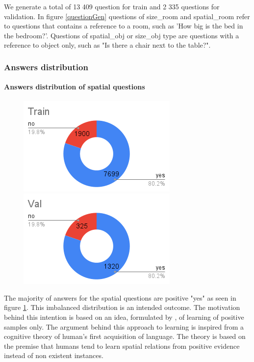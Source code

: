We generate a total of 13 409 question for train and 2 335 questions for validation.  In figure \ref{questionGen} questions of size\_room and spatial\_room refer to questions that contains a reference to a room, such as 'How big is the bed in the bedroom?'. Questions of spatial\_obj or size\_obj type are questions with a reference to object only, such as "Is there a chair next to the table?". 

\subsubsection{Answers distribution}

\paragraph{Answers distribution of spatial questions}

\begin{figure}[H]
\includegraphics[scale=0.45]{latex/images/TrAnSp.png}
\includegraphics[scale=0.45]{latex/images/VlAnSp.png}
\label{fig:AnsDist}
\caption{}
\end{figure}

The majority of answers for the spatial questions are positive "yes" as seen in figure \ref{fig:AnsDist}. This imbalanced distribution is an intended outcome. The motivation behind this intention is based on an idea, formulated by \cite{regier1996human}, of learning of positive samples only. The argument behind this approach to learning  is inspired from a cognitive theory of human's first acquisition of language. The theory is  based on the premise that humans tend to learn spatial relations from positive evidence instead of non existent instances.

